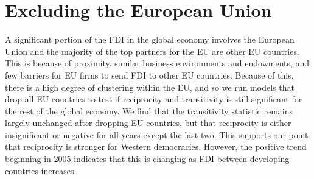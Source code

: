 \documentclass[reqno,onecolumn,letterpaper,12pt]{article}
\begin{document}
{\section{Excluding the European Union}\label{EUresults}

A significant portion of the FDI in the global economy involves the European Union and the majority of the top partners for the EU are other EU countries. This is because of proximity, similar business environments and endowments, and few barriers for EU firms to send FDI to other EU countries. Because of this, there is a high degree of clustering within the EU, and so we run models that drop all EU countries to test if reciprocity and transitivity is still significant for the rest of the global economy. We find that the transitivity statistic remains largely unchanged after dropping EU countries, but that reciprocity is either insignificant or negative for all years except the last two. This supports our point that reciprocity is stronger for Western democracies. However, the positive trend beginning in 2005 indicates that this is changing as FDI between developing countries increases.



}
\end{document}
